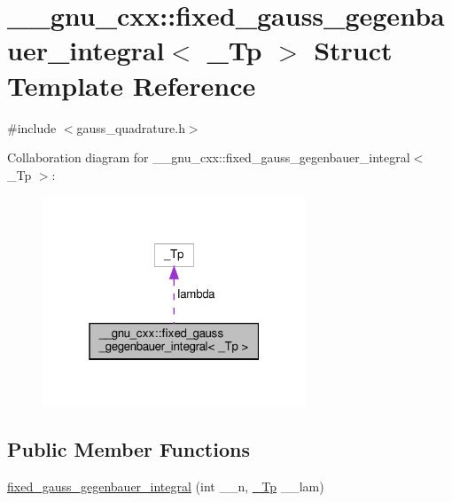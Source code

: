 \hypertarget{struct____gnu__cxx_1_1fixed__gauss__gegenbauer__integral}{}\section{\+\_\+\+\_\+gnu\+\_\+cxx\+:\+:fixed\+\_\+gauss\+\_\+gegenbauer\+\_\+integral$<$ \+\_\+\+Tp $>$ Struct Template Reference}
\label{struct____gnu__cxx_1_1fixed__gauss__gegenbauer__integral}


{\ttfamily \#include $<$gauss\+\_\+quadrature.\+h$>$}



Collaboration diagram for \+\_\+\+\_\+gnu\+\_\+cxx\+:\+:fixed\+\_\+gauss\+\_\+gegenbauer\+\_\+integral$<$ \+\_\+\+Tp $>$\+:
\nopagebreak
\begin{figure}[H]
\begin{center}
\leavevmode
\includegraphics[width=223pt]{struct____gnu__cxx_1_1fixed__gauss__gegenbauer__integral__coll__graph}
\end{center}
\end{figure}
\subsection*{Public Member Functions}
\begin{DoxyCompactItemize}
\item 
\hyperlink{struct____gnu__cxx_1_1fixed__gauss__gegenbauer__integral_a2581f15261fcf06cffd06c99c9cca97e}{fixed\+\_\+gauss\+\_\+gegenbauer\+\_\+integral} (int \+\_\+\+\_\+n, \hyperlink{namespace____gnu__cxx_a3b19a9c800ca194374ef9172290f7d79}{\+\_\+\+Tp} \+\_\+\+\_\+lam)
\end{DoxyCompactItemize}
